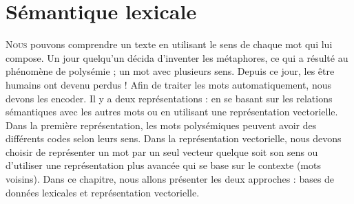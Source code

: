\documentclass{KodeBook}
\begin{document}
		\mainmatter
	
\fi
\chapter{Sémantique lexicale}

\begin{introduction}
	\lettrine{N}{ous} pouvons comprendre un texte en utilisant le sens de chaque mot qui lui compose. 
	Un jour quelqu'un décida d'inventer les métaphores, ce qui a résulté au phénomène de polysémie ; un mot avec plusieurs sens. 
	Depuis ce jour, les être humains ont devenu perdus ! 
	Afin de traiter les mots automatiquement, nous devons les encoder.
	Il y a deux représentations : en se basant sur les relations sémantiques avec les autres mots ou en utilisant une représentation vectorielle. 
	Dans la première représentation, les mots polysémiques peuvent avoir des différents codes selon leurs sens. 
	Dans la représentation vectorielle, nous devons choisir de représenter un mot par un seul vecteur quelque soit son sens ou d'utiliser une représentation plus avancée qui se base sur le contexte (mots voisins).
	Dans ce chapitre, nous allons présenter les deux approches : bases de données lexicales et représentation vectorielle.
\end{introduction} 
\end{document}
